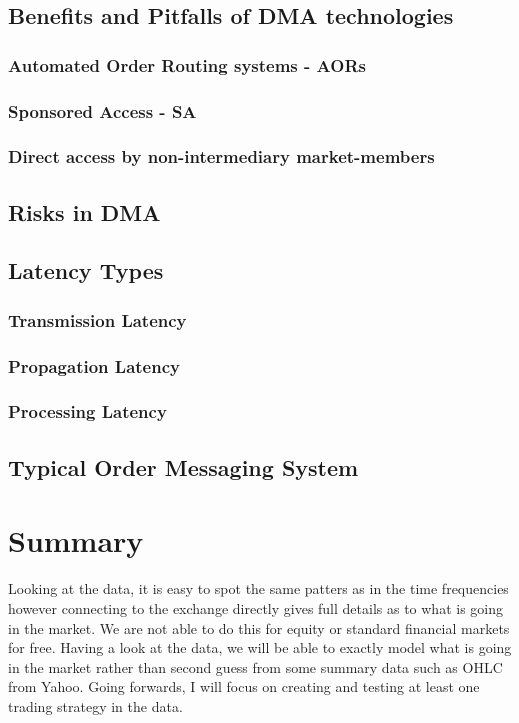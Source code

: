 \documentclass[12pt]{article}
\begin{document}
\subsection{Benefits and Pitfalls of DMA technologies}
\subsubsection{Automated Order Routing systems - AORs}
\subsubsection{Sponsored Access - SA}
\subsubsection{Direct access by non-intermediary market-members}
\subsection{Risks in DMA}
\subsection{Latency Types}
\subsubsection{Transmission Latency}
\subsubsection{Propagation Latency}
\subsubsection{Processing Latency}
\subsection{Typical Order Messaging System}
\label{sec:Messaging}

\pagebreak
\section*{Summary}
Looking at the data, it is easy to spot the same patters as in the time frequencies however connecting to the exchange directly gives full details as to what is going in the market. We are not able to do this for equity or standard financial markets for free. Having a look at the data, we will be able to exactly model what is going in the market rather than second guess from some summary data such as OHLC from Yahoo.
Going forwards, I will focus on creating and testing at least one trading strategy in the data.
\end{document}
